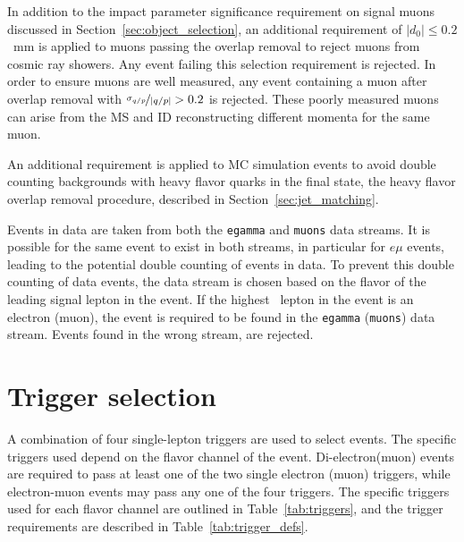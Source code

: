 In addition to the impact parameter significance requirement on signal muons
discussed in Section~\ref{sec:object_selection}, an additional requirement of
$|d_0| \leq 0.2$~mm is applied to muons passing the overlap removal to reject
muons from cosmic ray showers. Any event failing this selection requirement is
rejected.
In order to ensure muons are well measured, any event containing a muon after
overlap removal with $\nicefrac{\sigma_{q/p}}{|q/p|} > 0.2$ is rejected.
These poorly measured muons can arise from the MS and ID reconstructing
different momenta for the same muon.

An additional requirement is applied to MC simulation events to avoid double
counting backgrounds with heavy flavor quarks in the final state, the heavy
flavor overlap removal procedure, described in Section~\ref{sec:jet_matching}.

Events in data are taken from both the \texttt{egamma} and \texttt{muons} data
streams.
It is possible for the same event to exist in both streams, in particular for
$e\mu$ events, leading to the potential double counting of events in data.
To prevent this double counting of data events, the data stream is chosen based
on the flavor of the leading signal lepton in the event.
If the highest \pt\ lepton in the event is an electron (muon), the event is
required to be found in the \texttt{egamma} (\texttt{muons}) data stream.
Events found in the wrong stream, are rejected.

\FloatBarrier
\section{Trigger selection}
\label{sec:trigger_selection}

A combination of four single-lepton triggers are used to select events.
The specific triggers used depend on the flavor channel of the event.
Di-electron(muon) events are required to pass at least one of the two single
electron (muon) triggers, while electron-muon events may pass any one of the
four triggers.
The specific triggers used for each flavor channel are outlined in
Table~\ref{tab:triggers}, and the trigger requirements are described in
Table~\ref{tab:trigger_defs}.


